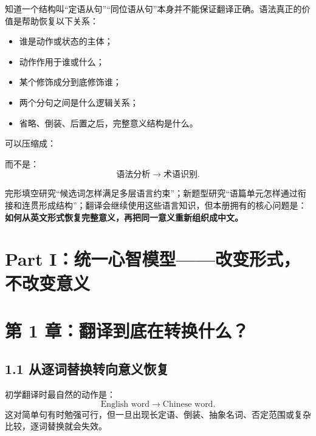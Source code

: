 \documentclass[11pt,a4paper]{ctexart}
\newcommand{\kw}[1]{\textbf{#1}}
\begin{document}
知道一个结构叫“定语从句”“同位语从句”本身并不能保证翻译正确。语法真正的价值是帮助恢复以下关系：
\begin{itemize}
  \item 谁是动作或状态的主体；
  \item 动作作用于谁或什么；
  \item 某个修饰成分到底修饰谁；
  \item 两个分句之间是什么逻辑关系；
  \item 省略、倒装、后置之后，完整意义结构是什么。
\end{itemize}

可以压缩成：
\begin{center}
\end{center}
而不是：
\[
\text{语法分析} \longrightarrow \text{术语识别}.
\]

\begin{bridge}
完形填空研究“候选词怎样满足多层语言约束”；新题型研究“语篇单元怎样通过衔接和连贯形成结构”；翻译会继续使用这些语言知识，但本册拥有的核心问题是：\kw{如何从英文形式恢复完整意义，再把同一意义重新组织成中文。}
\end{bridge}

\newpage
\section{Part I：统一心智模型——改变形式，不改变意义}

\section{第 1 章：翻译到底在转换什么？}

\subsection{1.1 从逐词替换转向意义恢复}
初学翻译时最自然的动作是：
\[
\text{English word} \rightarrow \text{Chinese word}.
\]
这对简单句有时勉强可行，但一旦出现长定语、倒装、抽象名词、否定范围或复杂比较，逐词替换就会失效。
\end{document}
